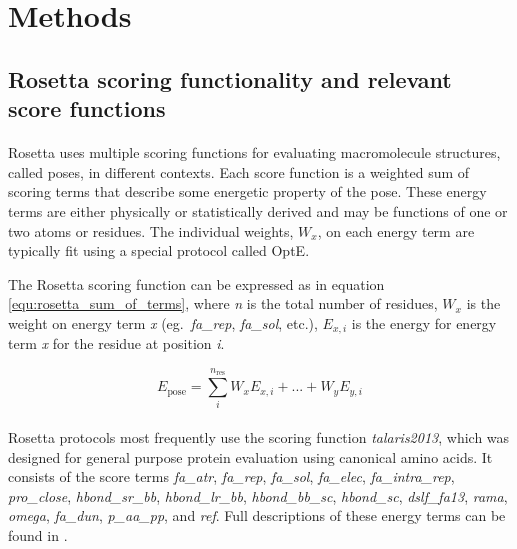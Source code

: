 \section{Methods}

\subsection{Rosetta scoring functionality and relevant score functions}
\paragraph{}
Rosetta uses multiple scoring functions for evaluating macromolecule structures, called poses, in different contexts.
Each score function is a weighted sum of scoring terms that describe some energetic property of the pose.
These energy terms are either physically or statistically derived and may be functions of one or two atoms or residues.
The individual weights, $W_x$, on each energy term are typically fit using a special protocol called OptE\cite{leaver-fay_chapter_2013}.

The Rosetta scoring function can be expressed as in equation \ref{equ:rosetta_sum_of_terms}, where \textit{n} is the total number of residues, $W_{x}$ is the weight on energy term \textit{x} (eg.\ \textit{fa\_rep}, \textit{fa\_sol}, etc.), $E_{x,i}$ is the energy for energy term \textit{x} for the residue at position \textit{i}.

\begin{equation}
  \label{equ:rosetta_sum_of_terms}
  E_{\text{pose}} = \sum_{i}^{n_{\text{res}}} W_{x} E_{x,i} + ... + W_{y} E_{y,i}
\end{equation}

\paragraph{}
Rosetta protocols most frequently use the scoring function \textit{talaris2013}, which was designed for general purpose protein evaluation using canonical amino acids\cite{leaver-fay_chapter_2013}.
It consists of the score terms \textit{fa\_atr}, \textit{fa\_rep}, \textit{fa\_sol}, \textit{fa\_elec}, \textit{fa\_intra\_rep}, \textit{pro\_close}, \textit{hbond\_sr\_bb}, \textit{hbond\_lr\_bb}, \textit{hbond\_bb\_sc}, \textit{hbond\_sc}, \textit{dslf\_fa13}, \textit{rama}, \textit{omega}, \textit{fa\_dun}, \textit{p\_aa\_pp}, and \textit{ref}.
Full descriptions of these energy terms can be found in \cite{leaver-fay_chapter_2013}.

